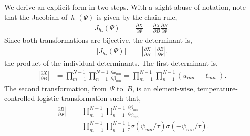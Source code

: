 We derive an explicit form in two steps. With a slight abuse of
notation, note that the Jacobian of~$h_\tau(\Psi)$ is given
by the chain rule,
\begin{align*}
  J_{h_\tau}(\Psi)
  &= \frac{\partial X}{\partial  \Psi}
    = \frac{\partial X}{\partial B} \frac{\partial B}{\partial \Psi}.
\end{align*}
Since both transformations are bijective, the determinant is,
\begin{align*}
  \big| J_{h_\tau}(\Psi) \big|
  &= \left| \frac{\partial X}{\partial B} \right| \,
     \left| \frac{\partial B}{\partial \Psi} \right|.
\end{align*}
the product
of the individual determinants.  The first determinant is,
\begin{align*}
  \left| \frac{\partial X}{\partial B} \right|
  &= \prod_{m=1}^{N-1} \prod_{n=1}^{N-1} \frac{\partial x_{mn} }{\partial {\beta}_{mn}} 
  = \prod_{m=1}^{N-1} \prod_{n=1}^{N-1} (u_{mn} - \ell_{mn}).
\end{align*}
The second transformation, from~$\Psi$ to~$B$, is an element-wise,
temperature-controlled logistic transformation such that,
\begin{align*}
  \left| \frac{\partial B}{\partial \Psi} \right| 
  &= \prod_{m=1}^{N-1} \prod_{n=1}^{N-1} \frac{\partial \beta_{mn}}{\partial \psi_{mn}} \\
  &= \prod_{m=1}^{N-1} \prod_{n=1}^{N-1}
    \frac{1}{\tau} \sigma \left(\psi_{mn} / \tau \right)
    \sigma \left(-\psi_{mn} / \tau \right).
\end{align*}




